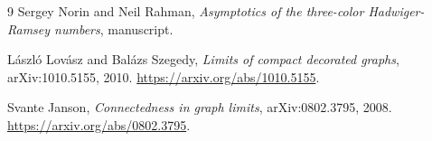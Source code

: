 \documentclass[11pt]{article}
\begin{document}
\begin{thebibliography}{9}
Sergey Norin and Neil Rahman,
\emph{Asymptotics of the three-color Hadwiger-Ramsey numbers}, manuscript.

L\'aszl\'o Lov\'asz and Bal\'azs Szegedy,
\emph{Limits of compact decorated graphs}, arXiv:1010.5155, 2010.
\url{https://arxiv.org/abs/1010.5155}.

Svante Janson,
\emph{Connectedness in graph limits}, arXiv:0802.3795, 2008.
\url{https://arxiv.org/abs/0802.3795}.
\end{thebibliography}
\end{document}
